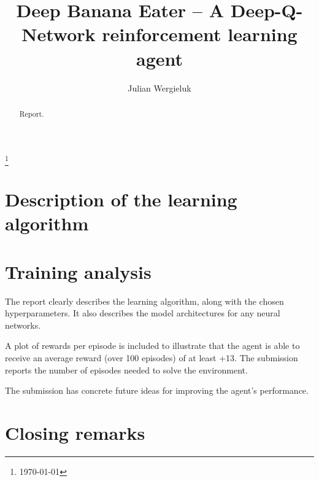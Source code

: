 \documentclass[a4paper,draft, 11pt]{amsart}
\title{Deep Banana Eater -- A Deep-Q-Network reinforcement learning agent}
\author{Julian Wergieluk}\address{}\email{julian@wergieluk.com}
\begin{document}
\begin{abstract}
Report.
\end{abstract}

\maketitle

\renewcommand*{\thefootnote}{}\footnote{\today{}}

\section{Description of the learning algorithm}

\section{Training analysis}

The report clearly describes the learning algorithm, along with the chosen
hyperparameters.
It also describes the model architectures for any neural networks.

A plot of rewards per episode is included to illustrate that the agent is able
to receive an average reward (over 100 episodes) of at least +13.
The submission reports the number of episodes needed to solve the environment.

The submission has concrete future ideas for improving the agent's performance.

\section{Closing remarks}

\printbibliography
\end{document}
